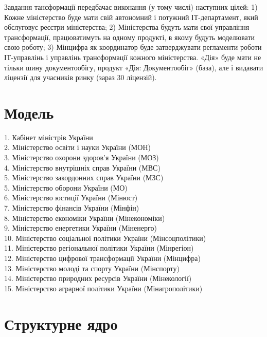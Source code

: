 Завдання тансформації передбачає виконання (у тому числі) наступних цілей:
1) Кожне міністерство буде мати свій автономний і потужний ІТ-департамент,
який обслуговує реєстри міністерства; 2) Міністерства будуть мати свої
управління трансформації, працюватимуть на одному продукті, в якому
будуть моделювати свою роботу; 3) Мінцифра як координатор буде затверджувати
регламенти роботи ІТ-управлінь і управлінь трансформації кожного міністерства.
«Дія» буде мати не тільки шину документообігу, продукт «Дія: Документообіг»
(база), але і видавати ліцензії для учасників ринку (зараз 30 ліцензій).

\section{Модель}

1. Кабінет міністрів України \\
2. Міністерство освіти і науки України (МОН) \\
3. Міністерство охорони здоров'я України (МОЗ) \\
4. Міністерство внутрішніх справ України (МВС) \\
5. Міністерство закордонних справ України (МЗС) \\
5. Міністерство оборони України (МО) \\
6. Міністерство юстиції України (Мінюст) \\
7. Міністерство фінансів України (Мінфін) \\
8. Міністерство економіки України (Мінекономіки) \\
9. Міністерство енергетики України (Міненерго) \\
10. Міністерство соціальної політики України (Мінсоцполітики) \\
11. Міністерство регіональної політики України (Мінрегіон) \\
12. Міністерство цифрової трансформації України (Мінцифра) \\
13. Міністерство молоді та спорту України (Мінспорту) \\
14. Міністерство природних ресурсів України (Мінекології) \\
15. Міністерство аграрної політики України (Мінагрополітики) \\

\newpage
\section{Структурне ядро}

